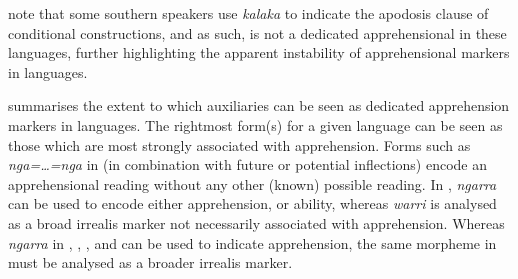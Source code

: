 \documentclass[output=paper,colorlinks,citecolor=brown]{langscibook}
\begin{document}
 \citet[231]{laughren_warlpiri-english_2007} note that some southern  speakers use \textit{kalaka} to indicate the apodosis clause of conditional constructions, and as such, is not a dedicated apprehensional in these languages, further highlighting the apparent instability of apprehensional markers in  languages.

 summarises the extent to which auxiliaries can be seen as dedicated apprehension markers in  languages. The rightmost form(s) for a given language can be seen as those which are most strongly associated with apprehension. Forms such as \textit{nga=\ldots=nga} in  (in combination with future or potential inflections) encode an apprehensional reading without any other (known) possible reading. In , \textit{ngarra} can be used to encode either apprehension, or ability, whereas \textit{warri} is analysed as a broad irrealis marker not necessarily associated with apprehension. Whereas \textit{ngarra} in , , , and  can be used to indicate apprehension, the same morpheme in  must be analysed as a broader irrealis marker.
\end{document}
